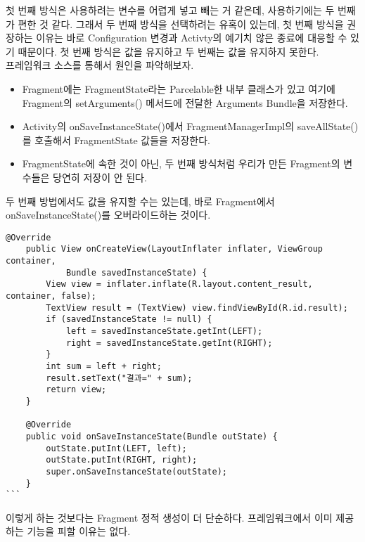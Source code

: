 첫 번째 방식은 사용하려는 변수를 어렵게 넣고 빼는 거 같은데, 사용하기에는 두 번째가 편한 것 같다.
그래서 두 번째 방식을 선택하려는 유혹이 있는데, 첫 번째 방식을 권장하는 이유는 바로 Configuration 변경과 Activty의 예기치 않은 종료에 대응할 수 있기 때문이다. 첫 번째 방식은 값을 유지하고 두 번째는 값을 유지하지 못한다.\\

프레임워크 소스를 통해서 원인을 파악해보자.
\begin{itemize}
\item Fragment에는 FragmentState라는 Parcelable한 내부 클래스가 있고 여기에 Fragment의 setArguments() 메서드에 전달한 Arguments Bundle을 저장한다.
\item Activity의 onSaveInstanceState()에서 FragmentManagerImpl의 saveAllState()를 호출해서 FragmentState 값들을 저장한다.
\item FragmentState에 속한 것이 아닌, 두 번째 방식처럼 우리가 만든 Fragment의 변수들은 당연히 저장이 안 된다.
\end{itemize}

두 번째 방법에서도 값을 유지할 수는 있는데, 바로 
Fragment에서 onSaveInstanceState()를 오버라이드하는 것이다.
\begin{lstlisting}[frame=single]
    @Override
    public View onCreateView(LayoutInflater inflater, ViewGroup container, 
    		Bundle savedInstanceState) {
        View view = inflater.inflate(R.layout.content_result, container, false);
        TextView result = (TextView) view.findViewById(R.id.result);
        if (savedInstanceState != null) {
            left = savedInstanceState.getInt(LEFT);
            right = savedInstanceState.getInt(RIGHT);
        }
        int sum = left + right;
        result.setText("결과=" + sum);
        return view;
    }

    @Override
    public void onSaveInstanceState(Bundle outState) {
        outState.putInt(LEFT, left);
        outState.putInt(RIGHT, right);
        super.onSaveInstanceState(outState);
    }
```
\end{lstlisting}
이렇게 하는 것보다는 Fragment 정적 생성이 더 단순하다. 프레임워크에서 이미 제공하는 기능을 피할 이유는 없다.

